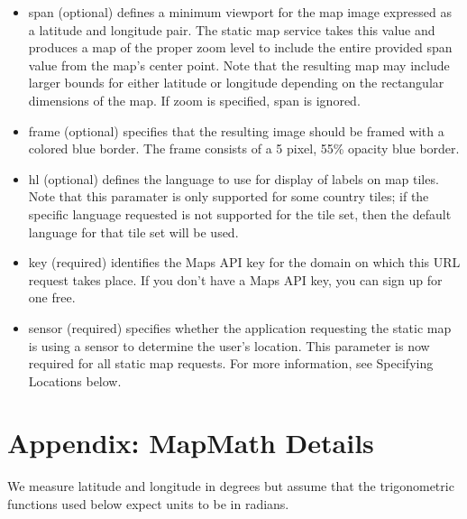\documentclass{article}
\begin{document}
\begin{itemize}
    \item span (optional) defines a minimum viewport for the map image expressed as a latitude and longitude pair. The static map service takes this value and produces a map of the proper zoom level to include the entire provided span value from the map's center point. Note that the resulting map may include larger bounds for either latitude or longitude depending on the rectangular dimensions of the map. If zoom is specified, span is ignored.
    \item frame (optional) specifies that the resulting image should be framed with a colored blue border. The frame consists of a 5 pixel, 55\% opacity blue border.
    \item hl (optional) defines the language to use for display of labels on map tiles. Note that this paramater is only supported for some country tiles; if the specific language requested is not supported for the tile set, then the default language for that tile set will be used.
    \item key (required) identifies the Maps API key for the domain on which this URL request takes place. If you don't have a Maps API key, you can sign up for one free.
    \item sensor (required) specifies whether the application requesting the static map is using a sensor to determine the user's location. This parameter is now required for all static map requests. For more information, see Specifying Locations below.
\end{itemize}

\section{Appendix: MapMath Details}

\noindent
We measure latitude and longitude in degrees but assume that the trigonometric functions used below expect units to be in radians.
\end{document}
